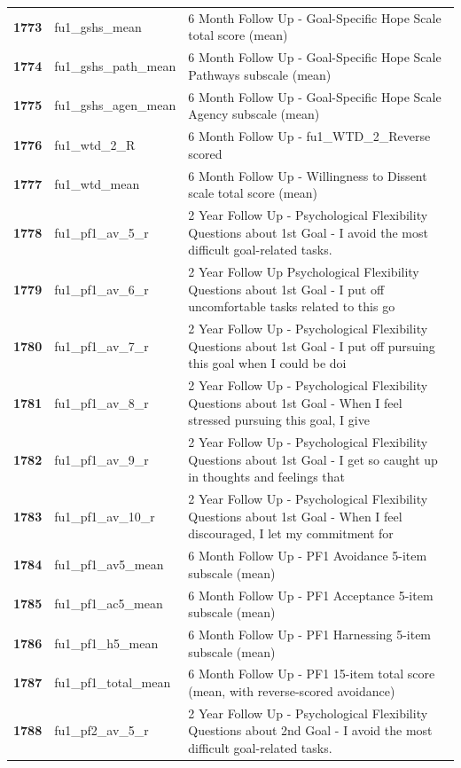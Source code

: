 \documentclass[
  letterpaper,
  DIV=11,
  numbers=noendperiod]{scrartcl}
\begin{document}
\begin{longtable}[t]{>{}cll}
\textbf{1773} & fu1\_gshs\_mean & 6 Month Follow Up - Goal-Specific Hope Scale total score (mean)\\
\textbf{1774} & fu1\_gshs\_path\_mean & 6 Month Follow Up - Goal-Specific Hope Scale Pathways subscale (mean)\\
\textbf{1775} & fu1\_gshs\_agen\_mean & 6 Month Follow Up - Goal-Specific Hope Scale Agency subscale (mean)\\
\addlinespace
\textbf{1776} & fu1\_wtd\_2\_R & 6 Month Follow Up - fu1\_WTD\_2\_Reverse scored\\
\textbf{1777} & fu1\_wtd\_mean & 6 Month Follow Up - Willingness to Dissent scale total score (mean)\\
\textbf{1778} & fu1\_pf1\_av\_5\_r & 2 Year Follow Up - Psychological Flexibility Questions about 1st Goal - I avoid the most difficult goal-related tasks.\\
\textbf{1779} & fu1\_pf1\_av\_6\_r & 2 Year Follow Up Psychological Flexibility Questions about 1st Goal - I put off uncomfortable tasks related to this go\\
\textbf{1780} & fu1\_pf1\_av\_7\_r & 2 Year Follow Up - Psychological Flexibility Questions about 1st Goal - I put off pursuing this goal when I could be doi\\
\addlinespace
\textbf{1781} & fu1\_pf1\_av\_8\_r & 2 Year Follow Up - Psychological Flexibility Questions about 1st Goal - When I feel stressed pursuing this goal, I give\\
\textbf{1782} & fu1\_pf1\_av\_9\_r & 2 Year Follow Up - Psychological Flexibility Questions about 1st Goal - I get so caught up in thoughts and feelings that\\
\textbf{1783} & fu1\_pf1\_av\_10\_r & 2 Year Follow Up - Psychological Flexibility Questions about 1st Goal - When I feel discouraged, I let my commitment for\\
\textbf{1784} & fu1\_pf1\_av5\_mean & 6 Month Follow Up - PF1 Avoidance 5-item subscale (mean)\\
\textbf{1785} & fu1\_pf1\_ac5\_mean & 6 Month Follow Up - PF1 Acceptance 5-item subscale (mean)\\
\addlinespace
\textbf{1786} & fu1\_pf1\_h5\_mean & 6 Month Follow Up - PF1 Harnessing 5-item subscale  (mean)\\
\textbf{1787} & fu1\_pf1\_total\_mean & 6 Month Follow Up - PF1 15-item total score (mean, with reverse-scored avoidance)\\
\textbf{1788} & fu1\_pf2\_av\_5\_r & 2 Year Follow Up - Psychological Flexibility Questions about 2nd Goal - I avoid the most difficult goal-related tasks.\\

\end{longtable}
\end{document}
